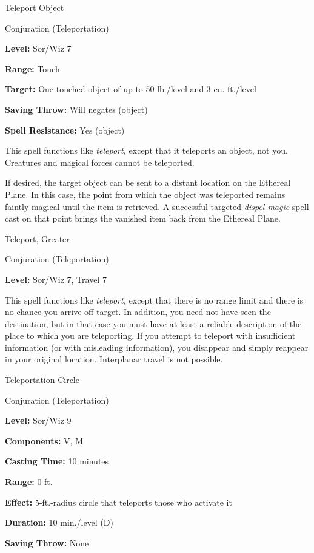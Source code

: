 \documentclass{article}
\begin{document}
\vspace{12pt}
Teleport Object

Conjuration (Teleportation)

\textbf{Level:} Sor/Wiz 7

\textbf{Range:} Touch

\textbf{Target:} One touched object of up to 50 lb./level and 3 cu. ft./level

\textbf{Saving Throw: }Will negates (object)

\textbf{Spell Resistance:} Yes (object)

This spell functions like \textit{teleport, }except that it teleports an object, 
not you. Creatures and magical forces cannot be teleported.

If desired, the target object can be sent to a distant location on the Ethereal 
Plane. In this case, the point from which the object was teleported remains faintly 
magical until the item is retrieved. A successful targeted \textit{dispel magic 
}spell cast on that point brings the vanished item back from the Ethereal Plane.

\vspace{12pt}
Teleport, Greater

Conjuration (Teleportation)

\textbf{Level:} Sor/Wiz 7, Travel 7

This spell functions like \textit{teleport, }except that there is no range limit 
and there is no chance you arrive off target. In addition, you need not have seen 
the destination, but in that case you must have at least a reliable description 
of the place to which you are teleporting. If you attempt to teleport with insufficient 
information (or with misleading information), you disappear and simply reappear 
in your original location. Interplanar travel is not possible.

\vspace{12pt}
Teleportation Circle

Conjuration (Teleportation)

\textbf{Level:} Sor/Wiz 9

\textbf{Components:} V, M

\textbf{Casting Time:} 10 minutes

\textbf{Range:} 0 ft.

\textbf{Effect:} 5-ft.-radius circle that teleports those who activate it

\textbf{Duration:} 10 min./level (D)

\textbf{Saving Throw:} None
\end{document}
